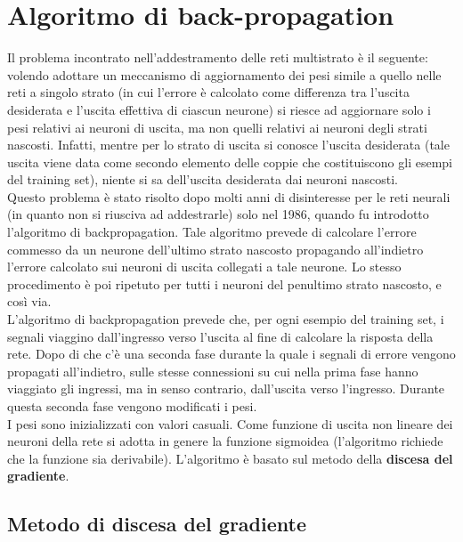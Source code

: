
\chapter{Algoritmo di back-propagation} %
\label{cha:algoritmo_di_back_propagation}
Il problema incontrato nell’addestramento delle reti multistrato è il seguente: volendo adottare un meccanismo di aggiornamento dei pesi simile a quello nelle reti a singolo strato (in cui l’errore è calcolato come differenza tra l’uscita desiderata e l’uscita effettiva di ciascun neurone) si riesce ad aggiornare solo i pesi relativi ai neuroni di uscita, ma non quelli relativi ai neuroni degli strati nascosti. Infatti, mentre per lo strato di uscita si conosce l’uscita desiderata (tale uscita viene data come secondo elemento delle coppie che costituiscono gli esempi del training set), niente si sa dell’uscita desiderata dai neuroni nascosti.\\

Questo problema è stato risolto dopo molti anni di disinteresse per le reti neurali (in quanto non si riusciva ad addestrarle) solo nel 1986, quando fu introdotto l’algoritmo di backpropagation. Tale algoritmo prevede di calcolare l’errore commesso da un neurone dell’ultimo strato nascosto propagando all’indietro l’errore calcolato sui neuroni di uscita collegati a tale neurone. Lo stesso procedimento è poi ripetuto per tutti i neuroni del penultimo strato nascosto, e così via.\\

L’algoritmo di backpropagation prevede che, per ogni esempio del training set, i segnali viaggino dall’ingresso verso l’uscita al fine di calcolare la risposta della rete. Dopo di che c’è una seconda fase durante la quale i segnali di errore vengono propagati all’indietro, sulle stesse connessioni su cui nella prima fase hanno viaggiato gli ingressi, ma in senso contrario, dall’uscita verso l’ingresso. Durante questa seconda fase vengono modificati i pesi.\\

I pesi sono inizializzati con valori casuali. Come funzione di uscita non lineare dei neuroni della rete si adotta in genere la funzione sigmoidea (l’algoritmo richiede che la funzione sia derivabile). L'algoritmo è basato sul metodo della \textbf{discesa del gradiente}.

\section{Metodo di discesa del gradiente} %
\label{sec:metodo_di_discesa_del_gradiente}

